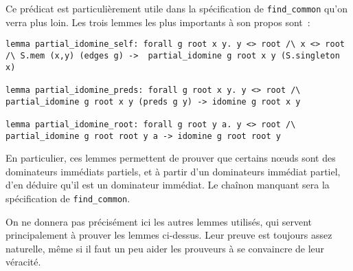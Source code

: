 \documentclass[a4paper,10pt]{article}
\begin{document}
Ce prédicat est particulièrement utile dans la spécification de \lstinline{find_common} qu'on verra plus loin. Les trois lemmes les plus importants à son propos sont~:
\begin{lstlisting}
lemma partial_idomine_self: forall g root x y. y <> root /\ x <> root /\ S.mem (x,y) (edges g) ->  partial_idomine g root x y (S.singleton x)

lemma partial_idomine_preds: forall g root x y. y <> root /\ partial_idomine g root x y (preds g y) -> idomine g root x y

lemma partial_idomine_root: forall g root y a. y <> root /\ partial_idomine g root root y a -> idomine g root root y
\end{lstlisting}

En particulier, ces lemmes permettent de prouver que certains nœuds sont des dominateurs immédiats partiels, et à partir d'un dominateurs immédiat partiel, d'en déduire qu'il est un dominateur immédiat. Le chaînon manquant sera la spécification de \lstinline{find_common}.

On ne donnera pas précisément ici les autres lemmes utilisés, qui servent principalement à prouver les lemmes ci-dessus. Leur preuve est toujours assez naturelle, même si il faut un peu aider les prouveurs à se convaincre de leur véracité.
\end{document}

